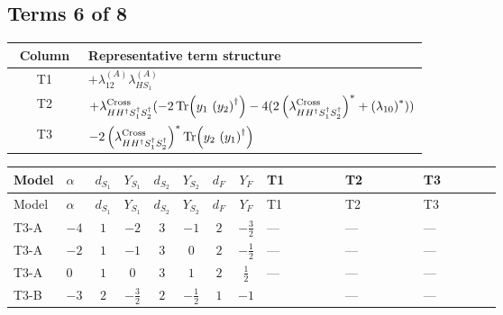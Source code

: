 \documentclass[8pt]{article}
\begin{document}
\begin{landscape}
\subsection*{Terms 6 of 8}
\begin{center}
\begin{tabular}{@{}c >{\raggedright\arraybackslash}p{0.82\linewidth}@{}}
\toprule
Column & Representative term structure \\
\midrule
T1 & \(\displaystyle +{\lambda_{12}^{(A)}} {\lambda_{HS_1}^{(A)}}\) \\
\midrule
T2 & \(\displaystyle +{\lambda_{H H^\dagger S_1^\dagger S_2^\dagger}^{\rm Cross}} (-2 \operatorname{Tr}\!\left({y_1}\,\left({y_2}\right)^{\dagger}\right)-4 (2 \left({\lambda_{H H^\dagger S_1^\dagger S_2^\dagger}^{\rm Cross}}\right)^{*}+\left({\lambda_{10}}\right)^{*}))\) \\
\midrule
T3 & \(\displaystyle -2 \left({\lambda_{H H^\dagger S_1^\dagger S_2^\dagger}^{\rm Cross}}\right)^{*} \operatorname{Tr}\!\left({y_2}\,\left({y_1}\right)^{\dagger}\right)\) \\
\midrule
\bottomrule
\end{tabular}
\end{center}
\smallskip
\tiny
\begin{longtable}{@{}llcccccc >{\raggedright\arraybackslash}p{0.21\linewidth} >{\raggedright\arraybackslash}p{0.21\linewidth} >{\raggedright\arraybackslash}p{0.21\linewidth}@{}}
\toprule
Model & $\alpha$ & $d_{S_1}$ & $Y_{S_1}$ & $d_{S_2}$ & $Y_{S_2}$ & $d_F$ & $Y_F$ & T1 & T2 & T3 \\
\midrule
\endfirsthead
\toprule
Model & $\alpha$ & $d_{S_1}$ & $Y_{S_1}$ & $d_{S_2}$ & $Y_{S_2}$ & $d_F$ & $Y_F$ & T1 & T2 & T3 \\
\midrule
\endhead
T3-A & $-4$ & $1$ & $-2$ & $3$ & $-1$ & $2$ & $-\frac{3}{2}$ & --- & --- & --- \\
\midrule
T3-A & $-2$ & $1$ & $-1$ & $3$ & $0$ & $2$ & $-\frac{1}{2}$ & --- & --- & --- \\
\midrule
T3-A & $0$ & $1$ & $0$ & $3$ & $1$ & $2$ & $\frac{1}{2}$ & --- & --- & --- \\
\midrule
T3-B & $-3$ & $2$ & $-\frac{3}{2}$ & $2$ & $-\frac{1}{2}$ & $1$ & $-1$ & \scriptsize\adjustbox{max width=\linewidth}{$\begin{gathered} +{\lambda_{12}^{(A)}} {\lambda_{HS_1}^{(A)}}\end{gathered}$} & --- & --- \\
\midrule

\end{longtable}
\end{landscape}
\end{document}
